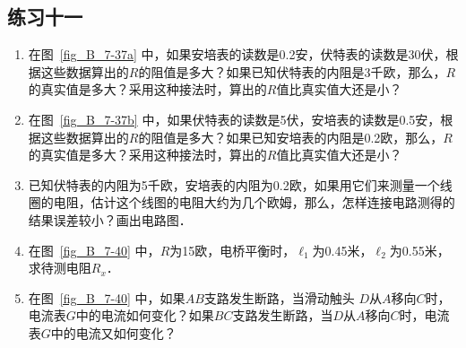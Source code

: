 \subsection*{练习十一}
\begin{enumerate}
    \item 在图~\ref{fig_B_7-37a} 中，如果安培表的读数是0.2安，伏特表的读数是30伏，根据这些数据算出的$R$的阻值是多大？如果已知伏特表的内阻是3千欧，那么，$R$的真实值是多大？采用这种接法时，算出的$R$值比真实值大还是小？
    \item 在图~\ref{fig_B_7-37b} 中，如果伏特表的读数是5伏，安培表的读数是0.5安，根据这些数据算出的$R$的阻值是多大？如果已知安培表的内阻是0.2欧，那么，$R$的真实值是多大？采用这种接法时，算出的$R$值比真实值大还是小？
    \item 已知伏特表的内阻为5千欧，安培表的内阻为0.2欧，如果用它们来测量一个线圈的电阻，估计这个线图的电阻大约为几个欧姆，那么，怎样连接电路测得的结果误差较小？画出电路图．
    \item 在图~\ref{fig_B_7-40} 中，$R$为15欧，电桥平衡时，$\ell_1$为0.45米，$\ell_2$为0.55米，求待测电阻$R_x$．
    \item 在图~\ref{fig_B_7-40} 中，如果$AB$支路发生断路，当滑动触头
    $D$从$A$移向$C$时，电流表$G$中的电流如何变化？如果$BC$支路发生断路，当$D$从$A$移向$C$时，电流表$G$中的电流又如何变化？
\end{enumerate}

